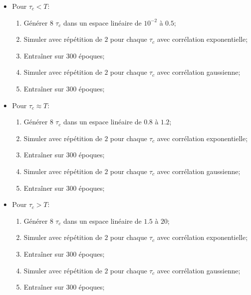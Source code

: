 \documentclass[MSc,french]{ulthese}
\begin{document}
\begin{itemize}
\item Pour $\tau_c < T$:
\begin{enumerate}
\item Générer $8$ $\tau_c$ dans un espace linéaire de $10^{-2}$ à $0.5$;
\item Simuler avec répétition de $2$ pour chaque $\tau_c$ avec corrélation exponentielle;
\item Entraîner sur $300$ époques;
\item Simuler avec répétition de $2$ pour chaque $\tau_c$ avec corrélation gaussienne;
\item Entraîner sur $300$ époques;
\end{enumerate}
\item Pour $\tau_c\approx T$:
\begin{enumerate}
\item Générer $8$ $\tau_c$ dans un espace linéaire de $0.8$ à $1.2$;
\item Simuler avec répétition de $2$ pour chaque $\tau_c$ avec corrélation exponentielle;
\item Entraîner sur $300$ époques;
\item Simuler avec répétition de $2$ pour chaque $\tau_c$ avec corrélation gaussienne;
\item Entraîner sur $300$ époques;
\end{enumerate}
\item Pour $\tau_c > T$:
\begin{enumerate}
\item Générer $8$ $\tau_c$ dans un espace linéaire de $1.5$ à $20$;
\item Simuler avec répétition de $2$ pour chaque $\tau_c$ avec corrélation exponentielle;
\item Entraîner sur $300$ époques;
\item Simuler avec répétition de $2$ pour chaque $\tau_c$ avec corrélation gaussienne;
\item Entraîner sur $300$ époques;
\end{enumerate}
\end{itemize}
\end{document}
